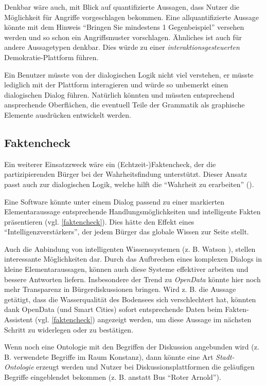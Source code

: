 \documentclass[11pt,a4paper,bibtotocnumbered]{scrreprt}
\begin{document}
Denkbar wäre auch, mit Blick auf quantifizierte Aussagen, dass Nutzer die Möglichkeit für Angriffe vorgeschlagen bekommen.
Eine allquantifizierte Aussage könnte mit dem Hinweis \enquote{Bringen Sie mindestens 1 Gegenbeispiel} versehen werden und so schon ein Angriffsmuster vorschlagen.
Ähnliches ist auch für andere Aussagetypen denkbar.
Dies würde zu einer \emph{interaktionsgesteuerten} Demokratie-Plattform führen.

Ein Benutzer müsste von der dialogischen Logik nicht viel verstehen, er müsste lediglich mit der Plattform interagieren und würde so unbemerkt einen dialogischen Dialog führen.
Natürlich könnten und müssten entsprechend ansprechende Oberflächen, die eventuell Teile der Grammatik als graphische Elemente ausdrücken entwickelt werden.

\subsection{Faktencheck} %

Ein weiterer Einsatzzweck wäre ein (Echtzeit-)Faktencheck, der die partizipierenden Bürger bei der Wahrheitsfindung unterstützt.
Dieser Ansatz passt auch zur dialogischen Logik, welche hilft die \enquote{Wahrheit zu erarbeiten} (\cite{OrtnerDL}).

Eine Software könnte unter einem Dialog passend zu einer markierten Elementaraussage entsprechende Handlungsmöglichkeiten und intelligente Fakten präsentieren (vgl. \autoref{faktencheck}).
Dies hätte den Effekt eines \enquote{Intelligenzverstärkers}, der jedem Bürger das globale Wissen zur Seite stellt.

Auch die Anbindung von intelligenten Wissenssystemen (z. B. Watson \cite{Watson}), stellen interessante Möglichkeiten dar.
Durch das Aufbrechen eines komplexen Dialogs in kleine Elementaraussagen, können auch diese Systeme effektiver arbeiten und bessere Antworten liefern.
Insbesondere der Trend zu \emph{OpenData} könnte hier noch mehr Transparenz in Bürgerdiskussionen bringen.
Wird z. B. die Aussage getätigt, dass die Wasserqualität des Bodensees sich verschlechtert hat, könnten dank OpenData (und Smart Cities) sofort entsprechende Daten beim Fakten-Assistent (vgl. \autoref{faktencheck}) angezeigt werden, um diese Aussage im nächsten Schritt zu widerlegen oder zu bestätigen.

Wenn noch eine Ontologie mit den Begriffen der Diskussion angebunden wird (z. B. verwendete Begriffe im Raum Konstanz), dann könnte eine Art \emph{Stadt-Ontologie} erzeugt werden und Nutzer bei Diskussionsplattformen die geläufigen Begriffe eingeblendet bekommen (z. B. anstatt Bus \enquote{Roter Arnold}).
\end{document}
